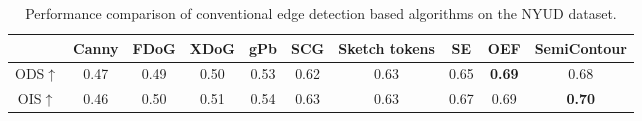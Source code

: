 \documentclass[a4paper, 10pt]{article}
\begin{document}
			\begin{table}[!htbp]
				\centering
				\tiny
					\begin{tabular}{c|c|c|c|c|c|c|c|c|c}
						
						\hline
						
						\textbf{} & \textbf{Canny} & \textbf{FDoG} & \textbf{XDoG} & \textbf{gPb} & \textbf{SCG} &  \textbf{Sketch tokens} & \textbf{SE} & \textbf{OEF} & \textbf{SemiContour} \\
						
						\hline
						
						ODS$\uparrow$ & 0.47 & 0.49 & 0.50 & 0.53 & 0.62 & 0.63 & 0.65 & \textbf{0.69} & 0.68 \\
						
						OIS$\uparrow$ & 0.46 & 0.50 & 0.51 & 0.54 & 0.63 & 0.63 & 0.67 & 0.69 & \textbf{0.70} \\
						
						\hline
						
					\end{tabular}
				\captionsetup{font=scriptsize} 
				\caption{\label{tab: Algorithms on the NYUD dataset}
					Performance comparison of conventional edge detection based algorithms on the NYUD dataset.} 
			\end{table}
			
\end{document}
